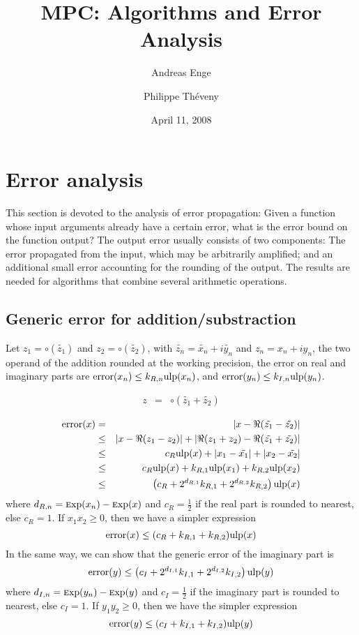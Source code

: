 \documentclass {article}
\title {MPC: Algorithms and Error Analysis}
\author {Andreas Enge \and Philippe Th\'eveny}
\date {April 11, 2008}
\DeclareMathOperator{\error}{error}
\newcommand {\Ulp}{{\rm ulp}}
\newcommand {\Exp}{{\rm \textsc exp}}
\begin{document}
\maketitle
\tableofcontents


\section {Error analysis}

This section is devoted to the analysis of error propagation: Given a function whose input arguments already have a certain error, what is the error bound on the function output? The output error usually consists of two components: The error propagated from the input, which may be arbitrarily amplified; and an additional small error accounting for the rounding of the output. The results are needed for algorithms that combine several arithmetic operations.

\subsection {Generic error for addition/substraction}

Let $z_1 = \circ(\tilde{z_1})$ and $z_2 = \circ(\tilde{z_2})$, with
$\tilde{z_n} = \tilde{x_n} + i \tilde{y_n}$ and $z_n = x_n + i y_n$,
the two operand of the addition rounded at the working precision, the error on
real and imaginary parts are $\error(x_n) \leq k_{R,n} \Ulp(x_n)$, and 
$\error(y_n) \leq k_{I,n} \Ulp(y_n)$.

\begin{eqnarray}
z&=&\circ(\tilde{z_1}+\tilde{z_2})\\\nonumber
\end{eqnarray}
\begin{eqnarray}\nonumber
\error(x)&=&|x-\Re(\tilde{z_1}-\tilde{z_2})|\\\nonumber
&\leq&|x-\Re(z_1-z_2)|+|\Re(z_1+z_2)-\Re(\tilde{z_1}+\tilde{z_2})|\\\nonumber
&\leq&c_R \Ulp(x) + |x_1 - \tilde{x_1}| + |x_2 - \tilde{x_2}|\\\nonumber
&\leq&c_R \Ulp(x) + k_{R,1} \Ulp(x_1) + k_{R,2} \Ulp(x_2)\\\nonumber
&\leq&\left(c_R + 2^{d_{R,1}} k_{R,1} + 2^{d_{R,2}} k_{R,2} \right) \Ulp(x)
\nonumber
\end{eqnarray}
where $d_{R,n}=\Exp(x_n)-\Exp(x)$ and $c_R=\frac{1}{2}$ if the real part is
rounded to nearest, else $c_R=1$. If $x_1x_2 \geq 0$, then we have a simpler
expression
\[
\error(x) \leq (c_R+k_{R,1}+k_{R,2}) \Ulp(x)
\]
In the same way, we can show that the generic error of the imaginary part is
\[
\error (y) \leq \left(c_I + 2^{d_{I,1}} k_{I,1} + 2^{d_{I,2}} k_{I,2} \right) \Ulp(y)
\]
where $d_{I,n}=\Exp(y_n)-\Exp(y)$ and $c_I=\frac{1}{2}$ if the imaginary part
is rounded to nearest, else $c_I=1$. If $y_1y_2 \geq 0$, then we have the simpler expression
\[
\error(y) \leq (c_I+k_{I,1}+k_{I,2}) \Ulp(y)
\]
\end{document}
